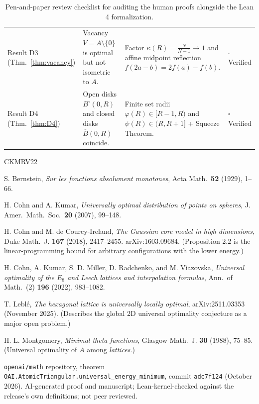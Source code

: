 \documentclass[11pt, a4paper]{article}
\theoremstyle{definition}
\theoremstyle{remark}
\newcommand{\Bbar}{\overline{B}}
\newcommand{\Bopen}{B^{\circ}}
\begin{document}
\begin{table}[htbp]
\begin{tabular}{@{}>{\raggedright\arraybackslash}p{2.2cm}>{\raggedright\arraybackslash}p{5.0cm}>{\raggedright\arraybackslash}p{5.2cm}>{\raggedright\arraybackslash}p{2.8cm}@{}}
Result D3 (Thm.~\ref{thm:vacancy}) & Vacancy $V = A \setminus \{0\}$ is optimal but not isometric to $A$. & Factor $\kappa(R) = \frac{N}{N-1} \to 1$ and affine midpoint reflection $f(2a-b) = 2f(a)-f(b)$. & $\square$ Verified \\[0.6em]
Result D4 (Thm.~\ref{thm:D4}) & Open disks $\Bopen(0, R)$ and closed disks $\Bbar(0, R)$ coincide. & Finite set radii $\varphi(R) \in [R-1, R)$ and $\psi(R) \in (R, R+1]$ + Squeeze Theorem. & $\square$ Verified \\
\bottomrule
\end{tabular}
\caption{Pen-and-paper review checklist for auditing the human proofs alongside the Lean 4 formalization.}
\end{table}

\begin{thebibliography}{CKMRV22}

 S. Bernstein, \emph{Sur les fonctions absolument monotones}, Acta Math.\ \textbf{52} (1929), 1--66.

 H. Cohn and A. Kumar, \emph{Universally optimal distribution of points on spheres}, J. Amer.\ Math.\ Soc.\ \textbf{20} (2007), 99--148.

 H. Cohn and M. de Courcy-Ireland, \emph{The Gaussian core model in high dimensions}, Duke Math.\ J. \textbf{167} (2018), 2417--2455. arXiv:1603.09684. (Proposition 2.2 is the linear-programming bound for arbitrary configurations with the lower energy.)

 H. Cohn, A. Kumar, S. D. Miller, D. Radchenko, and M. Viazovska, \emph{Universal optimality of the $E_8$ and Leech lattices and interpolation formulas}, Ann.\ of Math.\ (2) \textbf{196} (2022), 983--1082.

 T. Lebl\'e, \emph{The hexagonal lattice is universally locally optimal}, arXiv:2511.03353 (November 2025). (Describes the global 2D universal optimality conjecture as a major open problem.)

 H. L. Montgomery, \emph{Minimal theta functions}, Glasgow Math.\ J. \textbf{30} (1988), 75--85. (Universal optimality of $A$ among \emph{lattices}.)

 \texttt{openai/math} repository, theorem \texttt{OAI.\allowbreak AtomicTriangular.\allowbreak universal\_energy\_minimum}, commit \texttt{adc7f124} (October 2026). AI-generated proof and manuscript; Lean-kernel-checked against the release's own definitions; not peer reviewed.


\end{thebibliography}
\end{document}
